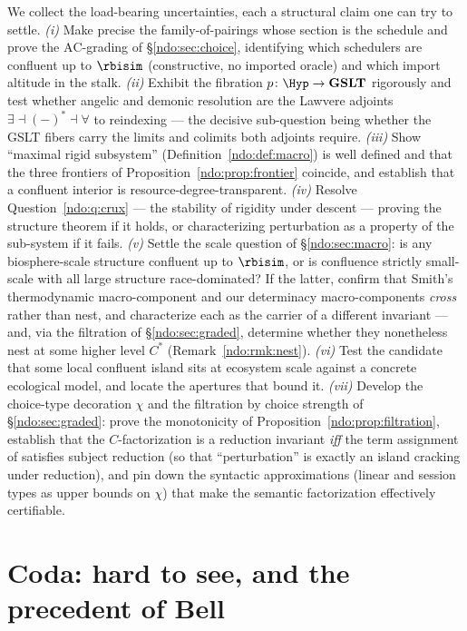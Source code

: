 We collect the load-bearing uncertainties, each a structural claim one can try to settle.
\emph{(i)} Make precise the family-of-pairings whose section is the schedule and prove the
$\mathrm{AC}$-grading of \S\ref{ndo:sec:choice}, identifying which schedulers are confluent up
to $\rbisim$ (constructive, no imported oracle) and which import altitude in the stalk.
\emph{(ii)} Exhibit the fibration $p\colon\Hyp\to\mathbf{GSLT}$ rigorously and test whether angelic
and demonic resolution are the Lawvere adjoints $\exists \dashv (-)^{*} \dashv \forall$ to
reindexing --- the decisive sub-question being whether the GSLT fibers carry the limits and
colimits both adjoints require. \emph{(iii)} Show ``maximal rigid subsystem''
(Definition~\ref{ndo:def:macro}) is well defined and that the three frontiers of
Proposition~\ref{ndo:prop:frontier} coincide, and establish that a confluent interior is
resource-degree-transparent. \emph{(iv)} Resolve Question~\ref{ndo:q:crux} --- the stability of
rigidity under descent --- proving the structure theorem if it holds, or characterizing
perturbation as a property of the sub-system if it fails. \emph{(v)} Settle the scale
question of \S\ref{ndo:sec:macro}: is any biosphere-scale structure confluent up to $\rbisim$,
or is confluence strictly small-scale with all large structure race-dominated? If the
latter, confirm that Smith's thermodynamic macro-component and our determinacy
macro-components \emph{cross} rather than nest, and characterize each as the carrier of a
different invariant --- and, via the filtration of \S\ref{ndo:sec:graded}, determine whether they
nonetheless nest at some higher level $C^{*}$ (Remark~\ref{ndo:rmk:nest}). \emph{(vi)} Test the
candidate that some local confluent island sits at ecosystem scale against a concrete ecological
model, and locate the apertures that bound it. \emph{(vii)} Develop the choice-type decoration
$\chi$ and the filtration by choice strength of \S\ref{ndo:sec:graded}: prove the monotonicity of
Proposition~\ref{ndo:prop:filtration}, establish that the $C$-factorization is a reduction invariant
\emph{iff} the term assignment of \cite{choicesched} satisfies subject reduction (so that
``perturbation'' is exactly an island cracking under reduction), and pin down the syntactic
approximations (linear and session types as upper bounds on $\chi$) that make the semantic
factorization effectively certifiable.


\section{Coda: hard to see, and the precedent of Bell}\label{ndo:sec:coda}

